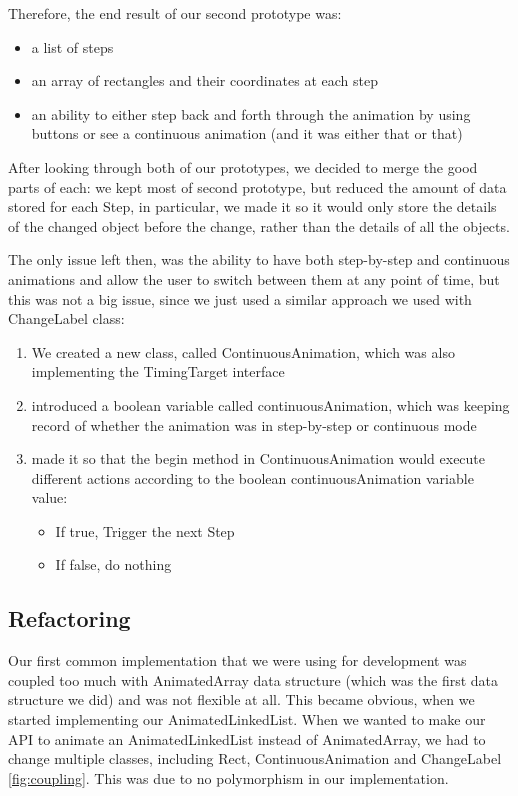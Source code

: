 \documentclass{l3proj}
\begin{document}
Therefore, the end result of our second prototype was:
\begin{itemize}
	\item a list of steps
	\item an array of rectangles and their coordinates at each step
	\item an ability to either step back and forth through the animation by using buttons or see a continuous animation (and it was either that or that)
\end{itemize}

After looking through both of our prototypes, we decided to merge the good parts of each: we kept most of second prototype, but reduced the amount of data stored for each Step, in particular, we made it so it would only store the details of the changed object before the change, rather than the details of all the objects.

The only issue left then, was the ability to have both step-by-step and continuous animations and allow the user to switch between them at any point of time, but this was not a big issue, since we just used a similar approach we used with ChangeLabel class:
\begin{enumerate}
	\item We created a new class, called ContinuousAnimation, which was also implementing the TimingTarget interface
	\item introduced a boolean variable called continuousAnimation, which was keeping record of whether the animation was in step-by-step or continuous mode
	\item made it so that the begin method in ContinuousAnimation would execute different actions according to the boolean continuousAnimation variable value:
	\begin{itemize}
		\item If true, Trigger the next Step
		\item If false, do nothing
	\end{itemize}
\end{enumerate}

\subsection{Refactoring}
\label{PE:refactoring}

Our first common implementation that we were using for development was coupled too much with AnimatedArray data structure (which was the first data structure we did) and was not flexible at all. This became obvious, when we started implementing our AnimatedLinkedList. When we wanted to make our API to animate an AnimatedLinkedList instead of AnimatedArray, we had to change multiple classes, including Rect, ContinuousAnimation and ChangeLabel \ref{fig:coupling}. This was due to no polymorphism in our implementation.
\end{document}
